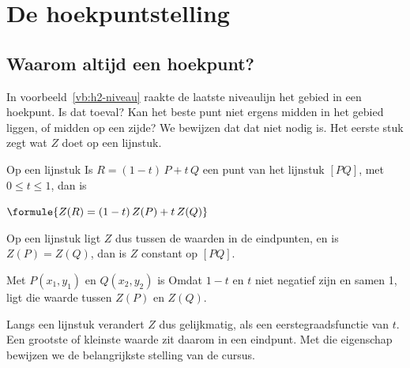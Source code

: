 \begin{oefeningen}
\end{oefeningen}

\section{De hoekpuntstelling}

\subsection{Waarom altijd een hoekpunt?}

In voorbeeld~\ref{vb:h2-niveau} raakte de laatste niveaulijn het gebied in een hoekpunt. Is dat toeval? Kan het beste punt niet ergens midden in het gebied liggen, of midden op een zijde? We bewijzen dat dat niet nodig is. Het eerste stuk zegt wat $Z$ doet op een lijnstuk.

\begin{theorie}
\begin{stelling}{Op een lijnstuk}
Is $R = (1 - t)\,P + t\,Q$ een punt van het lijnstuk $[PQ]$, met $0 \leqslant t \leqslant 1$, dan is

\vspace{1mm}
\qquad $\formule{Z(R) = (1 - t)\,Z(P) + t\,Z(Q)}$

\vspace{1mm}
Op een lijnstuk ligt $Z$ dus tussen de waarden in de eindpunten, en is $Z(P) = Z(Q)$, dan is $Z$ constant op $[PQ]$.
\end{stelling}

\begin{bewijs}
Met $P(x_1, y_1)$ en $Q(x_2, y_2)$ is
Omdat $1 - t$ en $t$ niet negatief zijn en samen 1, ligt die waarde tussen $Z(P)$ en $Z(Q)$.
\end{bewijs}
\end{theorie}

Langs een lijnstuk verandert $Z$ dus gelijkmatig, als een eerstegraadsfunctie van $t$. Een grootste of kleinste waarde zit daarom in een eindpunt. Met die eigenschap bewijzen we de belangrijkste stelling van de cursus.

